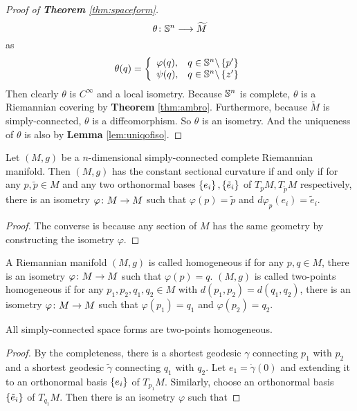 \begin{enumerate}[label=\arabic{*}.]
\begin{proof}[Proof of \textbf{Theorem} \ref{thm:spaceform}]
		\begin{equation*}
			\theta \colon \mathbb{S}^n \longrightarrow \widetilde{M}
		\end{equation*}
		as
		\begin{equation*}
			\theta(q) = \left\{
				\begin{array}{ll}
					\varphi(q),&q \in \mathbb{S}^n \backslash \left\{p^\prime\right\} \\
					\psi(q),& q \in \mathbb{S}^n \backslash \left\{z^\prime\right\}
				\end{array}
			\right.
		\end{equation*}
		Then clearly $\theta$ is $C^\infty$ and a local isometry. Because $\mathbb{S}^n$ is complete, $\theta$ is a Riemannian covering by \textbf{Theorem} \ref{thm:ambro}. Furthermore, because $\widetilde{M}$ is simply-connected, $\theta$ is a diffeomorphism. So $\theta$ is an isometry. And the uniqueness of $\theta$ is also by \textbf{Lemma} \ref{lem:uniqofiso}.
	\end{proof}
	\begin{cor}
		Let $(M,g)$ be a $n$-dimensional simply-connected complete Riemannian manifold. Then $(M,g)$ has the constant sectional curvature if and only if for any $p,\tilde{p} \in M$ and any two orthonormal bases $\left\{e_i\right\},\left\{\tilde{e}_i\right\}$ of $T_pM,T_{\tilde{p}}M$ respectively, there is an isometry $\varphi \colon M \rightarrow M$ such that $\varphi(p) = \tilde{p}$ and $d\varphi_p(e_i) = \tilde{e}_i$.
	\end{cor}
	\begin{proof}
		The converse is because any section of $M$ has the same geometry by constructing the isometry $\varphi$.
	\end{proof}
	\begin{defn}
		A Riemannian manifold $(M,g)$ is called homogeneous if for any $p,q \in M$, there is an isometry $\varphi \colon M \rightarrow M$ such that $\varphi(p)=q$. $(M,g)$ is called two-points homogeneous if for any $p_1,p_2,q_1,q_2 \in M$ with $d(p_1,p_2) = d(q_1,q_2)$, there is an isometry $\varphi \colon M \rightarrow M$ such that $\varphi(p_1)=q_1$ and $\varphi(p_2)=q_2$.
	\end{defn}
	\begin{cor}
		All simply-connected space forms are two-points homogeneous.
	\end{cor}
	\begin{proof}
		By the completeness, there is a shortest geodesic $\gamma$ connecting $p_1$ with $p_2$ and a shortest geodesic $\widetilde{\gamma}$ connecting $q_1$ with $q_2$. Let $e_1 = \dot{\gamma}(0)$ and extending it to an orthonormal basis $\left\{e_i\right\}$ of $T_{p_1}M$. Similarly, choose an orthonormal basis $\left\{\tilde{e}_i\right\}$ of $T_{q_1}M$. Then there is an isometry $\varphi$ such that

\end{proof}
\end{enumerate}
